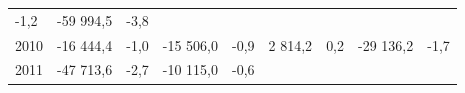 \begin{longtable}[]{@{}lllllllll@{}}
\begin{minipage}[t]{0.06\columnwidth}
-1,2\strut
\end{minipage} & \begin{minipage}[t]{0.09\columnwidth}\raggedright
-59 994,5\strut
\end{minipage} & \begin{minipage}[t]{0.06\columnwidth}\raggedright
-3,8\strut
\end{minipage}\tabularnewline
\begin{minipage}[t]{0.05\columnwidth}\raggedright
2010\strut
\end{minipage} & \begin{minipage}[t]{0.10\columnwidth}\raggedright
-16 444,4\strut
\end{minipage} & \begin{minipage}[t]{0.06\columnwidth}\raggedright
-1,0\strut
\end{minipage} & \begin{minipage}[t]{0.16\columnwidth}\raggedright
-15 506,0\strut
\end{minipage} & \begin{minipage}[t]{0.06\columnwidth}\raggedright
-0,9\strut
\end{minipage} & \begin{minipage}[t]{0.12\columnwidth}\raggedright
2 814,2\strut
\end{minipage} & \begin{minipage}[t]{0.06\columnwidth}\raggedright
0,2\strut
\end{minipage} & \begin{minipage}[t]{0.09\columnwidth}\raggedright
-29 136,2\strut
\end{minipage} & \begin{minipage}[t]{0.06\columnwidth}\raggedright
-1,7\strut
\end{minipage}\tabularnewline
\begin{minipage}[t]{0.05\columnwidth}\raggedright
2011\strut
\end{minipage} & \begin{minipage}[t]{0.10\columnwidth}\raggedright
-47 713,6\strut
\end{minipage} & \begin{minipage}[t]{0.06\columnwidth}\raggedright
-2,7\strut
\end{minipage} & \begin{minipage}[t]{0.16\columnwidth}\raggedright
-10 115,0\strut
\end{minipage} & \begin{minipage}[t]{0.06\columnwidth}\raggedright
-0,6\strut
\end{minipage} & \begin{minipage}[t]{0.12\columnwidth}\raggedright

\end{minipage}
\end{longtable}
